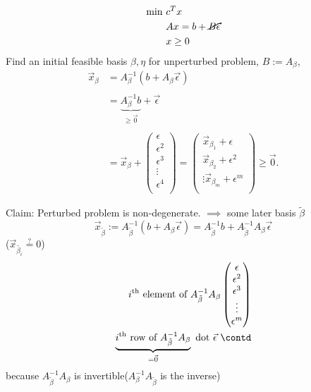 \begin{align*}
	\min~ & c^Tx                              \\
	      & Ax = b + \cancel{B\vec{\epsilon}} \\
	      & x\geq 0
\end{align*}
Find an initial feasible basis \(\beta, \eta \) for unperturbed problem, \(B:= A_{\beta}\),
\[
	\begin{split}
		\vec{x}_{\beta}
		&= A_{\beta}^{-1}(b + A_{\beta} \vec{\epsilon})\\\\
		&= \underbrace{A^{-1}_{\beta}b}_{\geq \vec{0}} + \vec{\epsilon}\\\\
		&= \vec{x}_{\beta} + \begin{pmatrix}
			\epsilon   \\
			\epsilon^2 \\
			\epsilon^3 \\
			\vdots     \\
			\epsilon^4 \\
		\end{pmatrix} = \begin{pmatrix}
			\vec{x}_{\beta_1} + \epsilon   \\
			\vec{x}_{\beta_2} + \epsilon^2 \\
			\vdots
			\vec{x}_{\beta_m} + \epsilon^m \\
		\end{pmatrix} \geq \vec{0}.
	\end{split}
\]

Claim: Perturbed problem is non-degenerate. \(\implies\) some later basis \(\tilde{\beta}\)
\[
	\vec{x}_{\tilde{\beta}} := A^{-1}_{\tilde{\beta}}(b + A_{\beta}\vec{\epsilon}) = A^{-1}_{\tilde{\beta}}b + A^{-1}_{\tilde{\beta}}A_{\beta}\vec{\epsilon}
\]
(\(\vec{x}_{\tilde{\beta_i}}\overset{?}{=}0\))
\[
	\begin{split}
		i^{\text{th}} \text{ element of }A^{-1}_{\tilde{\beta}}A_{\beta}\begin{pmatrix}
			\epsilon   \\
			\epsilon^2 \\
			\epsilon^3 \\
			\vdots     \\
			\epsilon^m \\
		\end{pmatrix}\\
		\underbrace{i^{\text{th}} \text{ row of } A^{-1}_{\tilde{\beta}}A_{\beta}}_{=\vec{0}} \text{ dot }\vec{\epsilon}\ \contd
	\end{split}
\]
because \(A^{-1}_{\tilde{\beta}}A_{\beta}\) is invertible(\(A^{-1}_{\beta}A_{\tilde{\beta}}\) is the inverse)